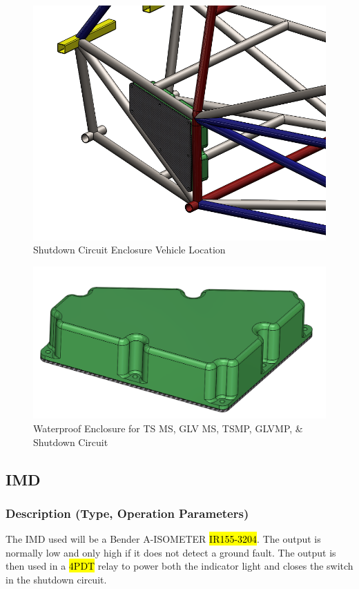 \documentclass{article}
\DeclareRobustCommand{\hlr}[1]{{\sethlcolor{red}\hl{#1}}}
\begin{document}
            \begin{figure}[H]
                \centering
                \includegraphics[width = 0.6 \textwidth]{CONTROLPANEL_1}
                \caption{Shutdown Circuit Enclosure Vehicle Location}
                \label{cpanel}
            \end{figure}

            \begin{figure}[H]
                \centering
                \includegraphics[width = 0.6 \textwidth]{CONTROLPANEL_2}
                \caption{Waterproof Enclosure for TS MS, GLV MS, TSMP, GLVMP, \& Shutdown Circuit}
                \label{cpanel2}
            \end{figure}

    \subsection{IMD}

        \subsubsection{Description (Type, Operation Parameters)}
        
            The IMD used will be a Bender A-ISOMETER \hlr{IR155-3204}. The output is normally low and only high if it does not detect a ground fault. The output is then used in a \hlr{4PDT} relay to power both the indicator light and closes the switch in the shutdown circuit.
            
\end{document}
